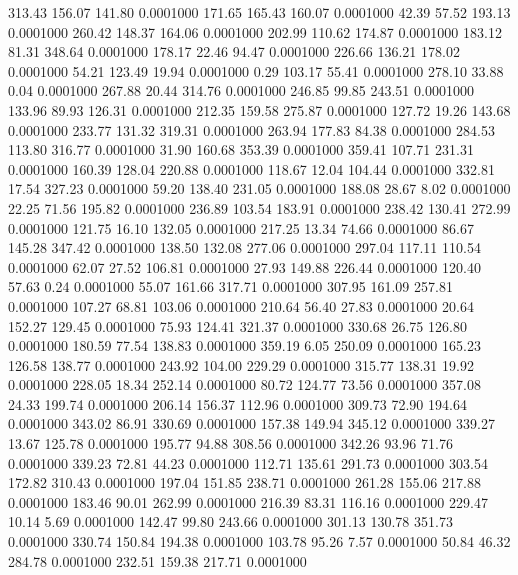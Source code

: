  313.43  156.07  141.80   0.0001000
 171.65  165.43  160.07   0.0001000
  42.39   57.52  193.13   0.0001000
 260.42  148.37  164.06   0.0001000
 202.99  110.62  174.87   0.0001000
 183.12   81.31  348.64   0.0001000
 178.17   22.46   94.47   0.0001000
 226.66  136.21  178.02   0.0001000
  54.21  123.49   19.94   0.0001000
   0.29  103.17   55.41   0.0001000
 278.10   33.88    0.04   0.0001000
 267.88   20.44  314.76   0.0001000
 246.85   99.85  243.51   0.0001000
 133.96   89.93  126.31   0.0001000
 212.35  159.58  275.87   0.0001000
 127.72   19.26  143.68   0.0001000
 233.77  131.32  319.31   0.0001000
 263.94  177.83   84.38   0.0001000
 284.53  113.80  316.77   0.0001000
  31.90  160.68  353.39   0.0001000
 359.41  107.71  231.31   0.0001000
 160.39  128.04  220.88   0.0001000
 118.67   12.04  104.44   0.0001000
 332.81   17.54  327.23   0.0001000
  59.20  138.40  231.05   0.0001000
 188.08   28.67    8.02   0.0001000
  22.25   71.56  195.82   0.0001000
 236.89  103.54  183.91   0.0001000
 238.42  130.41  272.99   0.0001000
 121.75   16.10  132.05   0.0001000
 217.25   13.34   74.66   0.0001000
  86.67  145.28  347.42   0.0001000
 138.50  132.08  277.06   0.0001000
 297.04  117.11  110.54   0.0001000
  62.07   27.52  106.81   0.0001000
  27.93  149.88  226.44   0.0001000
 120.40   57.63    0.24   0.0001000
  55.07  161.66  317.71   0.0001000
 307.95  161.09  257.81   0.0001000
 107.27   68.81  103.06   0.0001000
 210.64   56.40   27.83   0.0001000
  20.64  152.27  129.45   0.0001000
  75.93  124.41  321.37   0.0001000
 330.68   26.75  126.80   0.0001000
 180.59   77.54  138.83   0.0001000
 359.19    6.05  250.09   0.0001000
 165.23  126.58  138.77   0.0001000
 243.92  104.00  229.29   0.0001000
 315.77  138.31   19.92   0.0001000
 228.05   18.34  252.14   0.0001000
  80.72  124.77   73.56   0.0001000
 357.08   24.33  199.74   0.0001000
 206.14  156.37  112.96   0.0001000
 309.73   72.90  194.64   0.0001000
 343.02   86.91  330.69   0.0001000
 157.38  149.94  345.12   0.0001000
 339.27   13.67  125.78   0.0001000
 195.77   94.88  308.56   0.0001000
 342.26   93.96   71.76   0.0001000
 339.23   72.81   44.23   0.0001000
 112.71  135.61  291.73   0.0001000
 303.54  172.82  310.43   0.0001000
 197.04  151.85  238.71   0.0001000
 261.28  155.06  217.88   0.0001000
 183.46   90.01  262.99   0.0001000
 216.39   83.31  116.16   0.0001000
 229.47   10.14    5.69   0.0001000
 142.47   99.80  243.66   0.0001000
 301.13  130.78  351.73   0.0001000
 330.74  150.84  194.38   0.0001000
 103.78   95.26    7.57   0.0001000
  50.84   46.32  284.78   0.0001000
 232.51  159.38  217.71   0.0001000
